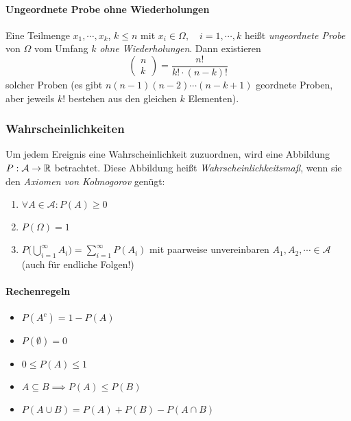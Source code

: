                 \paragraph{Ungeordnete Probe ohne Wiederholungen}
                    Eine Teilmenge \( x_1, \cdots, x_k \), \( k \leq n \) mit \( x_i \in \Omega, \quad i = 1, \cdots, k \) heißt \textit{ungeordnete Probe} von \(\Omega\) vom Umfang \(k\) \textit{ohne Wiederholungen}. Dann existieren
                    \begin{equation*}
                        \begin{pmatrix}
	                        n \\
	                        k
                        \end{pmatrix}
                        =
                        \frac{n!}{k! \cdot (n - k)!}
                    \end{equation*}
                    solcher Proben (es gibt \( n(n - 1)(n - 2) \cdots (n - k + 1) \) geordnete Proben, aber jeweils \(k!\) bestehen aus den gleichen \(k\) Elementen).
            
            \subsubsection{Wahrscheinlichkeiten}
                Um jedem Ereignis eine Wahrscheinlichkeit zuzuordnen, wird eine Abbildung \( P : \mathcal{A} \rightarrow \mathbb{R} \) betrachtet. Diese Abbildung heißt \textit{Wahrscheinlichkeitsmaß}, wenn sie den \textit{Axiomen von Kolmogorov} genügt:
                \begin{enumerate}
                	\item \( \forall A \in \mathcal{A} : P(A) \geq 0 \)
                	\item \( P(\Omega) = 1 \)
                	\item \( P\Big( \bigcup_{i = 1}^\infty A_i \Big) = \sum_{i = 1}^{\infty} P(A_i) \) mit paarweise unvereinbaren \( A_1, A_2, \cdots \in \mathcal{A} \) (auch für endliche Folgen!)
                \end{enumerate}
                
                \paragraph{Rechenregeln}
                \begin{itemize}
                	\item \( P(A^c) = 1 - P(A) \)
                	\item \( P(\emptyset) = 0 \)
                	\item \( 0 \leq P(A) \leq 1 \)
                	\item \( A \subseteq B \implies P(A) \leq P(B) \)
                	\item \( P(A \cup B) = P(A) + P(B) - P(A \cap B) \)
                \end{itemize}
                
